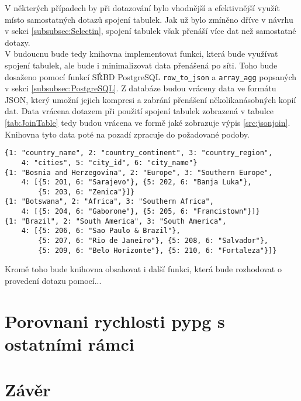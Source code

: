 \documentclass[ing,male,java,dept456]{diploma}						%
\begin{document}
V některých případech by při dotazování bylo vhodnější a efektivnější využít místo samostatných dotazů spojení tabulek. Jak už bylo zmíněno dříve v návrhu v sekci \ref{subsubsec:Selectin}, spojení tabulek však přenáší více dat než samostatné dotazy. \\ 
V budoucnu bude tedy knihovna implementovat funkci, která bude využívat spojení tabulek, ale bude i minimalizovat data přenášená po síti. Toho bude dosaženo pomocí funkcí SŘBD PostgreSQL \lstinline[style=inlinepython]|row_to_json| a \lstinline[style=inlinepython]|array_agg| popsaných v sekci \ref{subsubsec:PostgreSQL}. Z databáze budou vráceny data ve formátu JSON, který umožní jejich kompresi a zabrání přenášení několikanásobných kopií dat. Data vrácena dotazem při použití spojení tabulek zobrazená v tabulce \ref{tab:JoinTable} tedy budou vrácena ve formě jaké zobrazuje výpis \ref{src:jsonjoin}. Knihovna tyto data poté na pozadí zpracuje do požadované podoby. \\
\begin{lstlisting}[style=custompython, label=src:jsonjoin, caption={Minimalizace přenášených dat z tabulky \ref{tab:JoinTable} pomocí formátu JSON}]
{1: "country_name", 2: "country_continent", 3: "country_region", 
	4: "cities", 5: "city_id", 6: "city_name"}
{1: "Bosnia and Herzegovina", 2: "Europe", 3: "Southern Europe", 
	4: [{5: 201, 6: "Sarajevo"}, {5: 202, 6: "Banja Luka"}, 
		{5: 203, 6: "Zenica"}]}
{1: "Botswana", 2: "Africa", 3: "Southern Africa", 
	4: [{5: 204, 6: "Gaborone"}, {5: 205, 6: "Francistown"}]}
{1: "Brazil", 2: "South America", 3: "South America", 
	4: [{5: 206, 6: "Sao Paulo & Brazil"}, 
		{5: 207, 6: "Rio de Janeiro"}, {5: 208, 6: "Salvador"}, 
		{5: 209, 6: "Belo Horizonte"}, {5: 210, 6: "Fortaleza"}]}
\end{lstlisting}

Kromě toho bude knihovna obsahovat i další funkci, která bude rozhodovat o provedení dotazu pomocí...

\section{Porovnani rychlosti pypg s ostatními rámci}

\section{Závěr}
\label{sec:Conclusion}

\end{document}

